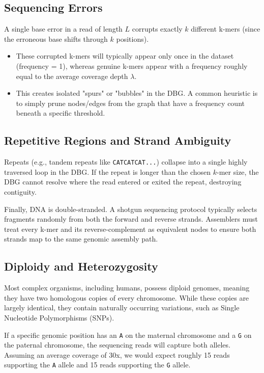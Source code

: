 \subsection{Sequencing Errors}
A single base error in a read of length $L$ corrupts exactly $k$ different k-mers (since the erroneous base shifts through $k$ positions).
\begin{itemize}
    \item These corrupted k-mers will typically appear only once in the dataset (frequency = 1), whereas genuine k-mers appear with a frequency roughly equal to the average coverage depth $\lambda$.
    \item This creates isolated "spurs" or "bubbles" in the DBG. A common heuristic is to simply prune nodes/edges from the graph that have a frequency count beneath a specific threshold.
\end{itemize}

\subsection{Repetitive Regions and Strand Ambiguity}
Repeats (e.g., tandem repeats like \texttt{CATCATCAT...}) collapse into a single highly traversed loop in the DBG. If the repeat is longer than the chosen $k$-mer size, the DBG cannot resolve where the read entered or exited the repeat, destroying contiguity.

Finally, DNA is double-stranded. A shotgun sequencing protocol typically selects fragments randomly from both the forward and reverse strands. Assemblers must treat every k-mer and its reverse-complement as equivalent nodes to ensure both strands map to the same genomic assembly path. 

\subsection{Diploidy and Heterozygosity}
Most complex organisms, including humans, possess diploid genomes, meaning they have two homologous copies of every chromosome. While these copies are largely identical, they contain naturally occurring variations, such as Single Nucleotide Polymorphisms (SNPs). 

If a specific genomic position has an \texttt{A} on the maternal chromosome and a \texttt{G} on the paternal chromosome, the sequencing reads will capture both alleles. Assuming an average coverage of 30x, we would expect roughly 15 reads supporting the \texttt{A} allele and 15 reads supporting the \texttt{G} allele.


